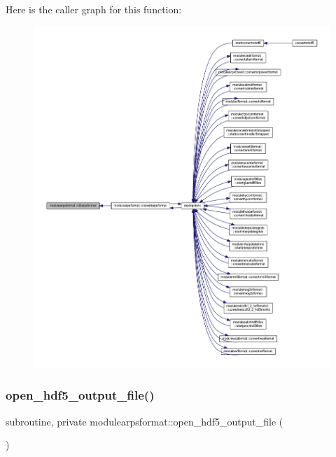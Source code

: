 Here is the caller graph for this function\+:\nopagebreak
\begin{figure}[H]
\begin{center}
\leavevmode
\includegraphics[width=350pt]{namespacemodulearpsformat_a3fbe9c856c732d4e5f2315c2ae61e3d3_icgraph}
\end{center}
\end{figure}
\mbox{\label{namespacemodulearpsformat_a9c9927c6fb171da5b0bfc4cd38595627}} 
\subsubsection{\texorpdfstring{open\+\_\+hdf5\+\_\+output\+\_\+file()}{open\_hdf5\_output\_file()}}
{\footnotesize\ttfamily subroutine, private modulearpsformat\+::open\+\_\+hdf5\+\_\+output\+\_\+file (\begin{DoxyParamCaption}{ }\end{DoxyParamCaption})\hspace{0.3cm}{\ttfamily [private]}}

